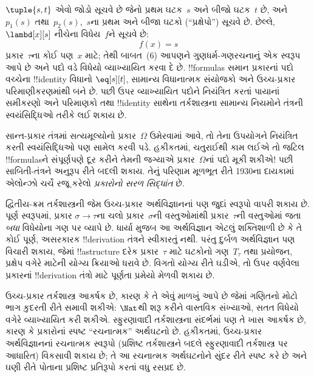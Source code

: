 \documentclass[../../../include/open-logic-section]{subfiles}
\begin{document}
$\tuple{s, t}$ એવો જોડો સૂચવે છે જેનો પ્રથમ ઘટક~$s$ અને બીજો ઘટક~$t$
છે, અને $p_1(s)$ તથા~$p_2(s)$,~$s$ના પ્રથમ અને બીજા ઘટકો
(``પ્રક્ષેપો'') સૂચવે છે. છેલ્લે, $\lambd[x][s]$ નીચેના વિધેય~$f$ને
સૂચવે છે:
\[
f(x) = s
\]
પ્રકાર~$\tau$ના કોઈ પણ~$x$ માટે; તેથી બાબત~(6) આપણને
ગુણધર્મ-ગણરચનાનું એક સ્વરૂપ આપે છે અને પદો વડે વિધેયો વ્યાખ્યાયિત કરવા
દે છે.
!!{formula}s સમાન પ્રકારનાં પદો વચ્ચેના !!{identity} વિધાનો
$\eq[s][t]$, સામાન્ય વિધાનાત્મક સંયોજકો અને ઉચ્ચ-પ્રકાર પરિમાણીકરણમાંથી
બને છે. પછી ઉપર વ્યાખ્યાયિત પદોને નિયંત્રિત કરતાં પાયાનાં સમીકરણો અને
પરિમાણકો તથા !!{identity} સાથેના તર્કશાસ્ત્રના સામાન્ય નિયમોને તંત્રની
સ્વયંસિદ્ધિઓ તરીકે લઈ શકાય છે.

સાન્ત-પ્રકાર તંત્રમાં સત્યમૂલ્યોનો પ્રકાર~$\Omega$ ઉમેરવામાં આવે, તો
તેના ઉપયોગને નિયંત્રિત કરતી સ્વયંસિદ્ધિઓ પણ સામેલ કરવી પડે. હકીકતમાં,
ચતુરાઈથી કામ લઈએ તો જટિલ !!{formula}sને સંપૂર્ણપણે દૂર કરીને તેમની
જગ્યાએ પ્રકાર~$\Omega$નાં પદો મૂકી શકીએ!{} પછી સાબિતી-તંત્રને અનુરૂપ
રીતે બદલી શકાય. તેનું પરિણામ મૂળભૂત રીતે 1930ના દાયકામાં એલોન્ઝો
ચર્ચે રજૂ કરેલો \emph{પ્રકારોનો સરળ સિદ્ધાંત} છે.

દ્વિતીય-ક્રમ તર્કશાસ્ત્રની જેમ ઉચ્ચ-પ્રકાર અર્થવિજ્ઞાનનાં પણ જુદાં
સ્વરૂપો વાપરી શકાય છે. પૂર્ણ સ્વરૂપમાં, પ્રકાર $\sigma \to \tau$ના ચલો
પ્રકાર~$\sigma$ની વસ્તુઓમાંથી પ્રકાર~$\tau$ની વસ્તુઓમાં જતા \emph{બધા}
વિધેયોના ગણ પર વ્યાપે છે. ધાર્યા મુજબ આ અર્થવિજ્ઞાન એટલું શક્તિશાળી છે
કે તે કોઈ પૂર્ણ, અસરકારક !!{derivation} તંત્રને સ્વીકારતું નથી. પરંતુ
દુર્બળ અર્થવિજ્ઞાન પણ વિચારી શકાય, જેમાં !!a{structure} દરેક
પ્રકાર~$\tau$ માટે ઘટકોનો ગણ~$T_\tau$ તથા પ્રયોજન, પ્રક્ષેપ
વગેરે માટેની યોગ્ય ક્રિયાઓ ધરાવે છે. વિગતો યોગ્ય રીતે ઘડીએ, તો ઉપર
વર્ણવેલા પ્રકારનાં !!{derivation} તંત્રો માટે પૂર્ણતા પ્રમેયો મેળવી
શકાય છે.

ઉચ્ચ-પ્રકાર તર્કશાસ્ત્ર આકર્ષક છે, કારણ કે તે એવું માળખું આપે છે જેમાં
ગણિતનો મોટો ભાગ કુદરતી રીતે સમાવી શકીએ: $\Nat$થી શરૂ કરીને વાસ્તવિક
સંખ્યાઓ, સતત વિધેયો વગેરે વ્યાખ્યાયિત કરી શકીએ. સ્ફુરણાવાદી
તર્કશાસ્ત્રના સંદર્ભમાં પણ તે ખાસ આકર્ષક છે, કારણ કે પ્રકારોનાં સ્પષ્ટ
``રચનાત્મક'' અર્થઘટનો છે. હકીકતમાં, ઉચ્ચ-પ્રકાર અર્થવિજ્ઞાનનાં
રચનાત્મક સ્વરૂપો (પ્રશિષ્ટ તર્કશાસ્ત્રને બદલે સ્ફુરણાવાદી તર્કશાસ્ત્ર
પર આધારિત) વિકસાવી શકાય છે; તે આ રચનાત્મક અર્થઘટનોને સુંદર રીતે સ્પષ્ટ
કરે છે અને ઘણી રીતે પોતાના પ્રશિષ્ટ પ્રતિરૂપો કરતાં વધુ રસપ્રદ છે.
\end{document}
